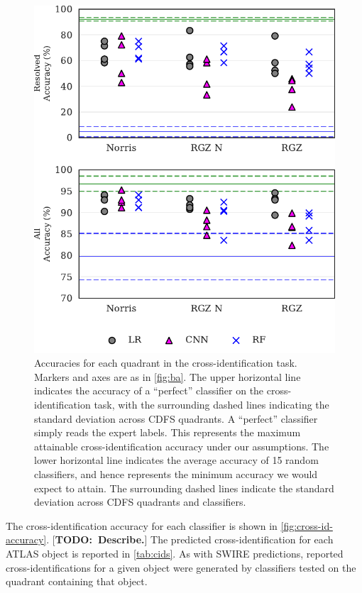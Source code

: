 \documentclass[fleqn,usenatbib,usedcolumn]{mnras}
\newcommand{\todo}[1]{ {\color{red}[{\bf TODO:~{#1}}]} }
\begin{document}
  \begin{figure}
  \centering
  \includegraphics[width=\columnwidth]{images/cdfs_cross_identification_grid.pdf}
  \caption{Accuracies for each quadrant in the cross-identification
    task. Markers and axes are as in \autoref{fig:ba}. The upper horizontal line
    indicates the accuracy of a ``perfect'' classifier on the
    cross-identification task, with the surrounding dashed lines indicating the
    standard deviation across CDFS quadrants. A ``perfect'' classifier simply
    reads the expert labels. This represents the maximum attainable
    cross-identification accuracy under our assumptions. The lower horizontal
    line indicates the average accuracy of 15 random classifiers, and hence
    represents the minimum accuracy we would expect to attain. The surrounding
    dashed lines indicate the standard deviation across CDFS quadrants and
    classifiers.
    \label{fig:cross-id-accuracy}}
  \end{figure}

  The cross-identification accuracy for each classifier is shown in
  \autoref{fig:cross-id-accuracy}. \todo{Describe.} The predicted
  cross-identification for each ATLAS object is reported in \autoref{tab:cids}.
  As with SWIRE predictions, reported cross-identifications for a given object
  were generated by classifiers tested on the quadrant containing that object.
\end{document}
